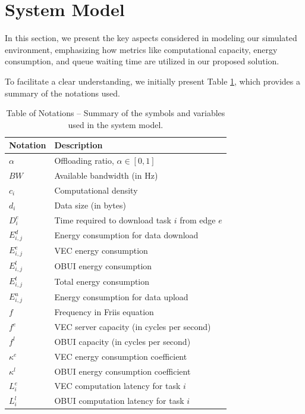 \documentclass[iicol]{sn-jnl}
\begin{document}
\section{System Model}\label{sec_system_model}
In this section, we present the key aspects considered in modeling our simulated environment, emphasizing how metrics like computational capacity, energy consumption, and queue waiting time are utilized in our proposed solution. 

To facilitate a clear understanding, we initially present Table \ref{tab_notations}, which provides a summary of the notations used.

\begin{table}[!ht]
    \caption{Table of Notations – Summary of the symbols and variables used in the system model.}\label{tab_notations}
    \begin{tabular}{ll}
        \toprule
        \bfseries Notation & \bfseries Description\\
        \midrule
        $\alpha$    & Offloading ratio, $\alpha \in [0,1]$ \\
        $BW$        & Available bandwidth (in Hz) \\
        $c_i$       & Computational density \\
        $d_i$       & Data size (in bytes) \\
        $D_i^e$     & Time required to download task $i$ from edge $e$\\
        $E_{i,j}^d$ & Energy consumption for data download \\
        $E_{i,j}^e$ & VEC energy consumption \\
        $E_{i,j}^l$ & OBUI energy consumption \\
        $E_{i,j}^t$ & Total energy consumption \\
        $E_{i,j}^u$ & Energy consumption for data upload \\
        $f$         & Frequency in Friis equation \\
        $f^e$       & VEC server capacity (in cycles per second) \\
        $f^l$       & OBUI capacity (in cycles per second) \\
        $\kappa^e$  & VEC energy consumption coefficient \\
        $\kappa^l$  & OBUI energy consumption coefficient \\
        $L_i^e$     & VEC computation latency for task $i$ \\
        $L_i^l$     & OBUI computation latency for task $i$ \\

\end{tabular}
\end{table}
\end{document}
